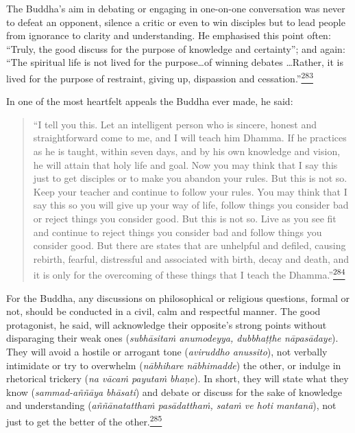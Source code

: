 The Buddha's aim in debating or engaging in one-on-one conversation was
never to defeat an opponent, silence a critic or even to win disciples
but to lead people from ignorance to clarity and understanding. He
emphasised this point often: ``Truly, the good discuss for the purpose
of knowledge and certainty''; and again: ``The spiritual life is not
lived for the purpose\ldots of winning debates \ldots Rather, it is
lived for the purpose of restraint, giving up, dispassion and
cessation.''\label{footprints_split_010.html_fnref283}\hyperref[footprints_split_024.htmlux5cux23fn283]{\textsuperscript{283}}

In one of the most heartfelt appeals the Buddha ever made, he said:

\begin{quote}
``I tell you this. Let an intelligent person who is sincere, honest and
straightforward come to me, and I will teach him Dhamma. If he practices
as he is taught, within seven days, and by his own knowledge and vision,
he will attain that holy life and goal. Now you may think that I say
this just to get disciples or to make you abandon your rules. But this
is not so. Keep your teacher and continue to follow your rules. You may
think that I say this so you will give up your way of life, follow
things you consider bad or reject things you consider good. But this is
not so. Live as you see fit and continue to reject things you consider
bad and follow things you consider good. But there are states that are
unhelpful and defiled, causing rebirth, fearful, distressful and
associated with birth, decay and death, and it is only for the
overcoming of these things that I teach the
Dhamma.''\label{footprints_split_010.html_fnref284}\hyperref[footprints_split_024.htmlux5cux23fn284]{\textsuperscript{284}}
\end{quote}

For the Buddha, any discussions on philosophical or religious questions,
formal or not, should be conducted in a civil, calm and respectful
manner. The good protagonist, he said, will acknowledge their opposite's
strong points without disparaging their weak ones (\emph{subhāsitaṁ
anumodeyya, dubbhaṭṭhe nāpasādaye}). They will avoid a hostile or
arrogant tone (\emph{aviruddho anussito}), not verbally intimidate or
try to overwhelm (\emph{nābhihare nābhimadde}) the other, or indulge in
rhetorical trickery (\emph{na vācaṁ payutaṁ bhaṇe}). In short, they will
state what they know (\emph{sammad-aññāya bhāsati}) and debate or
discuss for the sake of knowledge and understanding (\emph{aññānatatthaṁ
pasādatthaṁ, sataṁ ve hoti mantanā}), not just to get the better of the
other.\label{footprints_split_010.html_fnref285}\hyperref[footprints_split_024.htmlux5cux23fn285]{\textsuperscript{285}}

